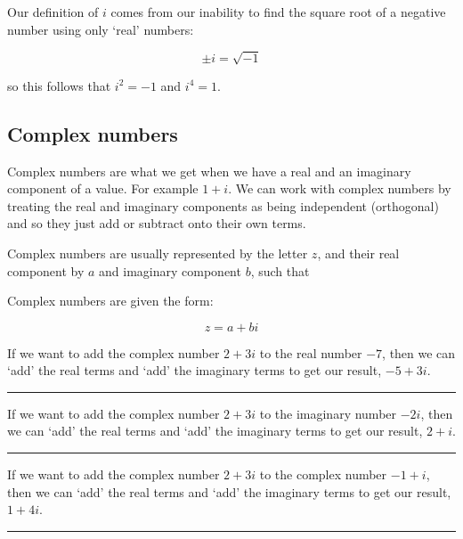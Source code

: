 \documentclass[
]{book}
\begin{document}
Our definition of \(i\) comes from our inability to find the square root of a negative number using only `real' numbers:

\begin{equation}
\pm i = \sqrt{-1}
\label{eq:imaginary}
\end{equation}

so this follows that \(i^2 = -1\) and \(i^4 = 1\).

\hypertarget{subsec:complex}{%
\subsection{Complex numbers}\label{subsec:complex}}

Complex numbers are what we get when we have a real and an imaginary component of a value. For example \(1 + i\). We can work with complex numbers by treating the real and imaginary components as being independent (orthogonal) and so they just add or subtract onto their own terms.

Complex numbers are usually represented by the letter \(z\), and their real component by \(a\) and imaginary component \(b\), such that

Complex numbers are given the form:

\begin{equation}
z=a+bi
\label{eq:complex}
\end{equation}

If we want to add the complex number \(2 + 3i\) to the real number \(-7\), then we can `add' the real terms and `add' the imaginary terms to get our result, \(-5+3i\).

\begin{center}\rule{0.5\linewidth}{0.5pt}\end{center}

If we want to add the complex number \(2 + 3i\) to the imaginary number \(-2i\), then we can `add' the real terms and `add' the imaginary terms to get our result, \(2+i\).

\begin{center}\rule{0.5\linewidth}{0.5pt}\end{center}

If we want to add the complex number \(2 + 3i\) to the complex number \(-1+i\), then we can `add' the real terms and `add' the imaginary terms to get our result, \(1+4i\).

\begin{center}\rule{0.5\linewidth}{0.5pt}\end{center}
\end{document}
